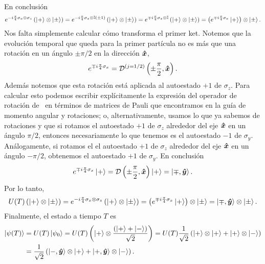 \documentclass[10pt, a4paper]{article}
\numberwithin{equation}{subsection}
\begin{document}
En conclusión
\begin{equation}
  e^{-i\frac{\pi}{4}\sigma_x\otimes\sigma_z}
    \left(\ket{+}\otimes\ket{\pm}\right)
  = e^{-i\frac{\pi}{4}\sigma_x\otimes\mathbb{I}(\pm1)}
    \left(\ket{+}\otimes\ket{\pm}\right)
  = e^{\mp i\frac{\pi}{4}\sigma_x\otimes\mathbb{I}}
    \left(\ket{+}\otimes\ket{\pm}\right)
  = \left(e^{\mp i\frac{\pi}{4}\sigma_x}\ket{+}\right) \otimes \ket{\pm}.
\end{equation}
Nos falta simplemente calcular cómo transforma el primer ket. Notemos que la
evolución temporal que queda para la primer partícula no es más que una
rotación en un ángulo $\pm \pi/2$ en la dirección $\vu*{x}$,
\begin{equation}
  e^{\mp i\frac{\pi}{4}\sigma_x}
  = \RotationOp^{(j=1/2)}\left(\pm\frac{\pi}{2},\vers{x}\right).
\end{equation}
Además notemos que esta rotación está aplicada al autoestado $+1$ de
$\sigma_z$. Para calcular esto podemos escribir explícitamente la expresión del
operador de rotación de \spinhalf~en términos de matrices de Pauli que
encontramos en la guía de momento angular y rotaciones; o, alternativamente,
usamos lo que ya sabemos de rotaciones y que si rotamos el autoestado $+1$ de
$\sigma_z$ alrededor del eje $\vu*{x}$ en un ángulo $\pi/2$, entonces
necesariamente lo que tenemos es el autoestado $-1$ de $\sigma_y$.
Análogamente, si rotamos el el autoestado $+1$ de $\sigma_z$ alrededor del eje
$\vu*{x}$ en un ángulo $-\pi/2$, obtenemos el autoestado $+1$ de $\sigma_y$.
En conclusión
\begin{equation}
  e^{\mp i\frac{\pi}{4}\sigma_x} \ket{+}
  = \RotationOp\left(\pm\frac{\pi}{2},\vers{x}\right)\ket{+}
  = \ket{\mp,\vers{y}}.
\end{equation}
Por lo tanto,
\begin{equation}
  U(T)\left(\ket{+}\otimes\ket{\pm}\right)
  = e^{-i\frac{\pi}{4}\sigma_x\otimes\sigma_z}
    \left(\ket{+}\otimes\ket{\pm}\right)
  = \left( e^{\mp i\frac{\pi}{4}\sigma_x} \ket{+} \right) \otimes \ket{\pm}
  = \ket{\mp,\vu*{y}}\otimes\ket{\pm}.
\end{equation}
Finalmente, el estado a tiempo $T$ es
\begin{align}
  \ket{\psi(T)}
  &= U(T)\ket{\psi_0}
  = U(T) \left(\ket{+}\otimes\frac{\left(\ket{+} + \ket{-}\right)}{\sqrt{2}}\right)
  = U(T) \frac{1}{\sqrt{2}} \left(\ket{+}\otimes\ket{+} +
    \ket{+}\otimes\ket{-}\right) \nonumber \\
  &= \frac{1}{\sqrt{2}} \left(\ket{-,\vu*{y}}\otimes\ket{+} +
    \ket{+,\vu*{y}}\otimes\ket{-}\right).
\end{align}
\end{document}
